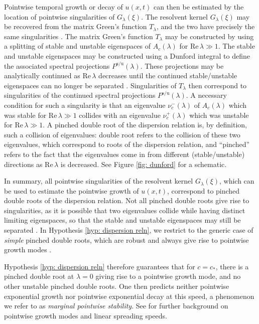 \documentclass[11pt]{article}
\renewcommand{\Re}{\mathrm{Re} \,}
\numberwithin{equation}{section}
\numberwithin{prop}{section}
\begin{document}
Pointwise temporal growth or decay of $u(x,t)$ can then be estimated by the location of pointwise singularities of $G_\lambda(\xi)$. The resolvent kernel $G_\lambda(\xi)$ may be recovered from the matrix Green's function $T_\lambda$, and the two have precisely the same singularities \cite[Lemma 2.1]{HolzerScheelPointwiseGrowth}. The matrix Green's function $T_\lambda$ may be constructed by using a splitting of stable and unstable eigenspaces of $A_c(\lambda)$ for $\Re \lambda \gg 1$. The stable and unstable eigenspaces may be constructed using a Dunford integral to define the associated spectral projections $P^\mathrm{s/u}(\lambda)$.  These projections may be analytically continued as $\Re \lambda$ decreases until the continued stable/unstable eigenspaces can no longer be separated \cite[Section 2]{HolzerScheelPointwiseGrowth}. Singularities of $T_\lambda$ then correspond to singularities of the continued spectral projections $P^\mathrm{s/u}(\lambda)$. A necessary condition for such a singularity is that an eigenvalue $\nu^-_c(\lambda)$ of $A_c(\lambda)$ which was stable for $\Re \lambda \gg 1$ collides with an eigenvalue $\nu^+_c(\lambda)$ which was unstable for $\Re \lambda \gg 1$. A pinched double root of the dispersion relation is, by definition, such a collision of eigenvalues: double root refers to the collision of these two eigenvalues, which correspond to roots of the dispersion relation, and ``pinched'' refers to the fact that the eigenvalues come in from different (stable/unstable) directions as $\Re \lambda$ is decreased. See Figure \ref{fig: dunford} for a schematic. 

In summary, all pointwise singularities of the resolvent kernel $G_\lambda (\xi)$, which can be used to estimate the pointwise growth of $u(x,t)$, correspond to pinched double roots of the dispersion relation. Not all pinched double roots give rise to singularities, as it is possible that two eigenvalues collide while having distinct limiting eigenspaces, so that the stable and unstable eigenspaces may still be separated \cite[Remark  5.5]{HolzerScheelPointwiseGrowth}. In Hypothesis \ref{hyp: dispersion reln}, we restrict to the generic case of \emph{simple} pinched double roots, which are robust \cite[Lemma 7.1]{CAMS} and always give rise to pointwise growth modes \cite[Lemma 4.4]{HolzerScheelPointwiseGrowth}. 

Hypothesis \ref{hyp: dispersion reln} therefore guarantees that for $c = c_*$, there is a pinched double root at $\lambda = 0$ giving rise to a pointwise growth mode, and no other unstable pinched double roots. One then predicts neither pointwise exponential growth nor pointwise exponential decay at this speed, a phenomenon we refer to as \emph{marginal pointwise stability}. See \cite{HolzerScheelPointwiseGrowth} for further background on pointwise growth modes and linear spreading speeds. 
\end{document}
